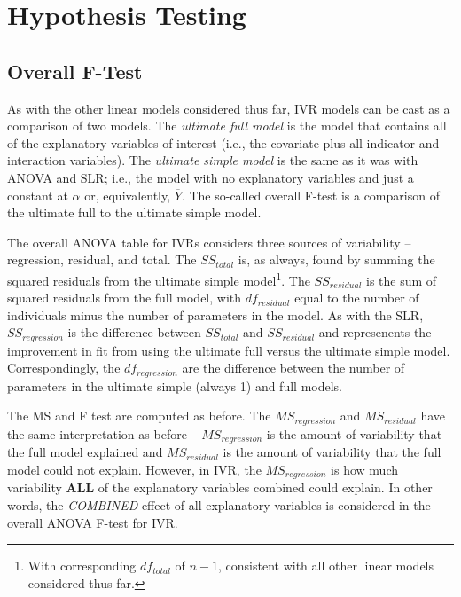 \documentclass[10pt,openany]{book}\usepackage[]{graphicx}\usepackage[]{color}
\begin{document}
\section{Hypothesis Testing}
\subsection{Overall F-Test}
As with the other linear models considered thus far, IVR models can be cast as a comparison of two models.  The \emph{ultimate full model} is the model that contains all of the explanatory variables of interest (i.e., the covariate plus all indicator and interaction variables).  The \emph{ultimate simple model} is the same as it was with ANOVA and SLR; i.e., the model with no explanatory variables and just a constant at $\alpha$ or, equivalently, $\overline{Y}$.  The so-called overall F-test is a comparison of the ultimate full to the ultimate simple model.


\vspace{-12pt}

The overall ANOVA table for IVRs considers three sources of variability -- regression, residual, and total.  The $SS_{total}$ is, as always, found by summing the squared residuals from the ultimate simple model\footnote{With corresponding $df_{total}$ of $n-1$, consistent with all other linear models considered thus far.}.  The $SS_{residual}$ is the sum of squared residuals from the full model, with $df_{residual}$ equal to the number of individuals minus the number of parameters in the model.  As with the SLR, $SS_{regression}$ is the difference between $SS_{total}$ and $SS_{residual}$ and represenents the improvement in fit from using the ultimate full versus the ultimate simple model.  Correspondingly, the $df_{regression}$ are the difference between the number of parameters in the ultimate simple (always 1) and full models.

The MS and F test are computed as before.  The $MS_{regression}$ and $MS_{residual}$ have the same interpretation as before -- $MS_{regression}$ is the amount of variability that the full model explained and $MS_{residual}$ is the amount of variability that the full model could not explain.  However, in IVR, the $MS_{regression}$ is how much variability \textbf{ALL} of the explanatory variables combined could explain.  In other words, the \emph{COMBINED} effect of all explanatory variables is considered in the overall ANOVA F-test for IVR.
\end{document}
